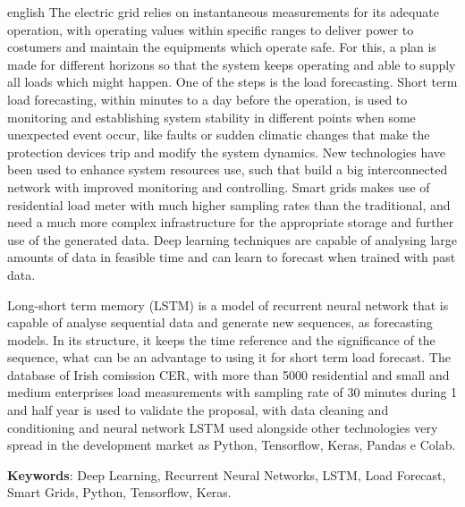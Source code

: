 \documentclass[
	12pt,				%
	oneside,			%
	a4paper,			%
	english,			%
	brazil				%
	]{abntex2}
\begin{document}
\begin{resumo}[Abstract]
 \begin{otherlanguage*}{english}
  The electric grid relies on instantaneous measurements for its adequate operation, with operating values within specific ranges to deliver power to costumers and maintain the equipments which operate safe. For this, a plan is made for different horizons so that the system keeps operating and able to supply all loads which might happen. One of the steps is the load forecasting. Short term load forecasting, within minutes to a day before the operation, is used to monitoring and establishing system stability in different points when some unexpected event occur, like faults or sudden climatic changes that make the protection devices trip and modify the system dynamics. 
   New technologies have been used to enhance system resources use, such that build a big interconnected network with improved monitoring and controlling. Smart grids makes use of residential load meter with much higher sampling rates than the traditional, and need a much more complex infrastructure for the appropriate storage and further use of the generated data. Deep learning techniques are capable of analysing large amounts of data in feasible time and can learn to forecast when trained with past data. 
   
   Long-short term memory (LSTM) is a model of recurrent neural network that is capable of analyse sequential data and generate new sequences, as forecasting models. In its structure, it keeps the time reference and the significance of the sequence, what can be an advantage to using it for short term load forecast. 
   The database of Irish comission CER, with more than 5000 residential and small and medium enterprises load measurements with sampling rate of 30 minutes during 1 and half year is used to validate the proposal, with data cleaning and conditioning and neural network LSTM used alongside other technologies very spread in the development market as Python, Tensorflow, Keras, Pandas e Colab. 

   \vspace{\onelineskip}
 
   \noindent 
   \textbf{Keywords}: Deep Learning, Recurrent Neural Networks, LSTM, Load Forecast, Smart Grids, Python, Tensorflow, Keras.
 \end{otherlanguage*}
\end{resumo}


\listoffigures*
\cleardoublepage
\end{document}

